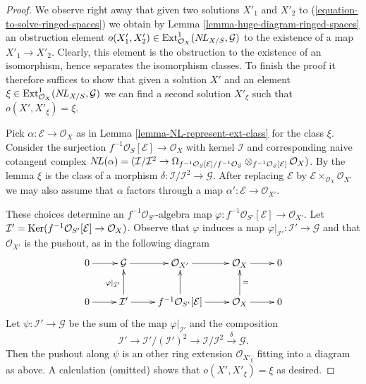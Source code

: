 \begin{proof}
We observe right away that given two solutions $X'_1$ and $X'_2$
to (\ref{equation-to-solve-ringed-spaces}) we obtain by
Lemma \ref{lemma-huge-diagram-ringed-spaces} an obstruction element
$o(X'_1, X'_2) \in \mathop{\mathrm{Ext}}\nolimits^1_{\mathcal{O}_X}(\mathop{N\!L}\nolimits_{X/S}, \mathcal{G})$
to the existence of a map $X'_1 \to X'_2$. Clearly, this element
is the obstruction to the existence of an isomorphism, hence separates
the isomorphism classes. To finish the proof it therefore suffices to
show that given a solution $X'$ and an element
$\xi \in \mathop{\mathrm{Ext}}\nolimits^1_{\mathcal{O}_X}(\mathop{N\!L}\nolimits_{X/S}, \mathcal{G})$
we can find a second solution $X'_\xi$ such that
$o(X', X'_\xi) = \xi$.

\medskip\noindent
Pick $\alpha : \mathcal{E} \to \mathcal{O}_X$ as in
Lemma \ref{lemma-NL-represent-ext-class}
for the class $\xi$. Consider the surjection
$f^{-1}\mathcal{O}_S[\mathcal{E}] \to \mathcal{O}_X$
with kernel $\mathcal{I}$ and corresponding naive cotangent complex
$\mathop{N\!L}\nolimits(\alpha) = (\mathcal{I}/\mathcal{I}^2 \to
\Omega_{f^{-1}\mathcal{O}_S[\mathcal{E}]/f^{-1}\mathcal{O}_S}
\otimes_{f^{-1}\mathcal{O}_S[\mathcal{E}]} \mathcal{O}_X)$.
By the lemma $\xi$ is the class of a morphism
$\delta : \mathcal{I}/\mathcal{I}^2 \to \mathcal{G}$.
After replacing $\mathcal{E}$ by
$\mathcal{E} \times_{\mathcal{O}_X} \mathcal{O}_{X'}$ we may also assume
that $\alpha$ factors through a map
$\alpha' : \mathcal{E} \to \mathcal{O}_{X'}$.

\medskip\noindent
These choices determine an $f^{-1}\mathcal{O}_{S'}$-algebra map
$\varphi : f^{-1}\mathcal{O}_{S'}[\mathcal{E}] \to \mathcal{O}_{X'}$. Let
$\mathcal{I}' = \mathop{\mathrm{Ker}}(f^{-1}\mathcal{O}_{S'}[\mathcal{E}] \to \mathcal{O}_X)$.
Observe that $\varphi$ induces a map
$\varphi|_{\mathcal{I}'} : \mathcal{I}' \to \mathcal{G}$
and that $\mathcal{O}_{X'}$ is the pushout, as in the following
diagram
$$
\xymatrix{
0 \ar[r] & \mathcal{G} \ar[r] & \mathcal{O}_{X'} \ar[r] &
\mathcal{O}_X \ar[r] & 0 \\
0 \ar[r] & \mathcal{I}' \ar[u]^{\varphi|_{\mathcal{I}'}} \ar[r] &
f^{-1}\mathcal{O}_{S'}[\mathcal{E}] \ar[u] \ar[r] &
\mathcal{O}_X \ar[u]_{=} \ar[r] & 0
}
$$
Let $\psi : \mathcal{I}' \to \mathcal{G}$ be the sum of the map
$\varphi|_{\mathcal{I}'}$ and the composition
$$
\mathcal{I}' \to \mathcal{I}'/(\mathcal{I}')^2 \to
\mathcal{I}/\mathcal{I}^2 \xrightarrow{\delta} \mathcal{G}.
$$
Then the pushout along $\psi$ is an other ring extension
$\mathcal{O}_{X'_\xi}$ fitting into a diagram as above.
A calculation (omitted) shows that $o(X', X'_\xi) = \xi$ as desired.
\end{proof}

